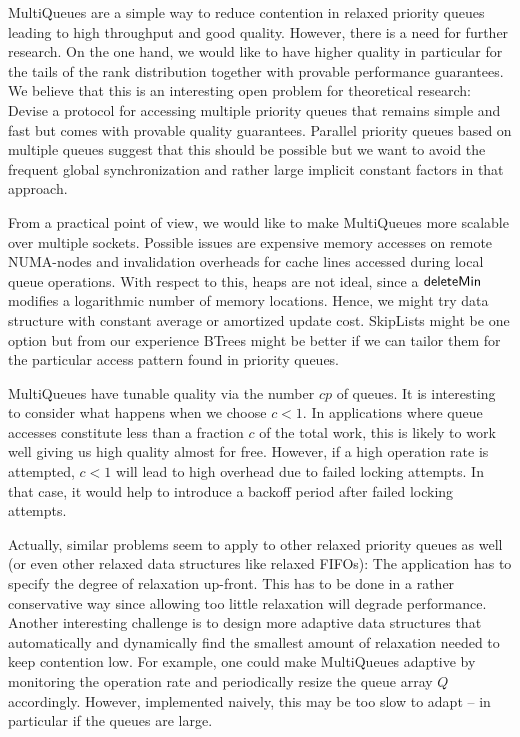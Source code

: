\documentclass[a4paper,12pt]{article}
\newcommand{\Id}[1]{\ensuremath{\text{{\sf #1}}}}
\begin{document}
MultiQueues are a simple way to reduce contention in relaxed priority queues leading to high throughput and good quality. However, there is a need for further research. On the one hand, we would like to have higher quality in particular for the tails of the rank distribution together with provable performance guarantees. We believe that this is an interesting open problem for theoretical research: Devise a protocol for accessing multiple priority queues 
that remains simple and fast but comes with provable quality guarantees.
Parallel priority queues based on multiple queues suggest that this should be possible \cite{San98a} but we want to avoid the frequent global synchronization and rather large implicit constant factors in that approach.

From a practical point of view, we would like to make MultiQueues more scalable over multiple sockets. Possible issues are expensive memory accesses on remote NUMA-nodes and invalidation overheads for cache lines accessed during local queue operations. With respect to this, heaps are not ideal, since a \Id{deleteMin} modifies a logarithmic number of memory locations. Hence, we might try data structure with constant average or amortized update cost. SkipLists might be one option but from our experience \cite{DKMS04} BTrees might be better if we can tailor them for the particular access pattern found in priority queues.





MultiQueues have tunable quality via the number $cp$ of queues. 
It is interesting to consider what happens when we choose $c<1$.
In applications where queue accesses constitute less than a fraction $c$ of the total work, this is likely to work well giving us high quality almost for free. However, if a high operation rate is attempted, $c<1$ will lead to high overhead due to failed locking attempts.  In that case, it would help to introduce a backoff period after failed locking attempts.

Actually, similar problems seem to apply to other relaxed priority queues as well (or even other relaxed data structures like relaxed FIFOs): The application has to specify the degree of relaxation up-front. This has to be done in a rather conservative way since allowing too little relaxation will degrade performance. Another interesting challenge is to design more adaptive data structures that automatically 
and dynamically find the smallest amount of relaxation needed to keep contention low. For example, one could make MultiQueues adaptive by monitoring the operation rate and periodically resize the queue array $Q$ accordingly. 
However, implemented naively, this may be too slow to adapt -- in particular if the queues are large. 
\end{document}
